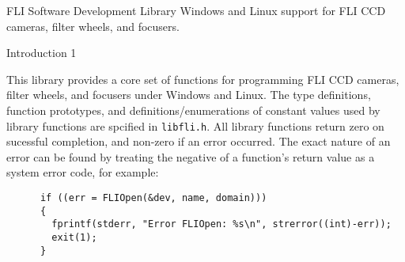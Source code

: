 \documentclass{article}
\begin{document}
\pagebreak
\sloppy
{}
\cxxVersion{
1.40
\strut}
\cxxTitle{}
        {FLI Software Development Library}
        {}
        {Windows and Linux support for FLI CCD cameras, filter wheels, and focusers. }
        {}
\begin{cxxContents}
\end{cxxContents}
\clearpage\pagebreak
\begin{cxxdoc}


\end{cxxdoc}
\begin{cxxentry}
{}
        {Introduction}
        {}
        {}
        {1}
\begin{cxxdoc}

This library provides a core set of functions for programming
FLI CCD cameras, filter wheels, and focusers under Windows and
Linux.  The type definitions, function prototypes, and
definitions/enumerations of constant values used by library
functions are spcified in \texttt{libfli.h}.  All library
functions return zero on sucessful completion, and non-zero if
an error occurred.  The exact nature of an error can be found by
treating the negative of a function's return value as a system
error code, for example:

\begin{verbatim}
      if ((err = FLIOpen(&dev, name, domain)))
      {
        fprintf(stderr, "Error FLIOpen: %s\n", strerror((int)-err));
        exit(1);
      }
      \end{verbatim}

\end{cxxdoc}
\end{cxxentry}
\end{document}
